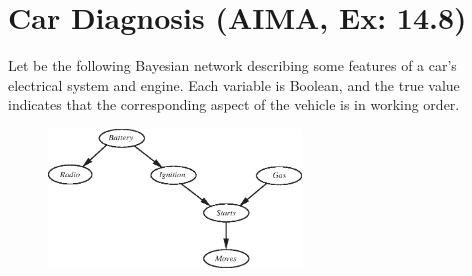 \documentclass[11pt, a4paper]{article}
\begin{document}
\newpage

\section{Car Diagnosis (AIMA, Ex: 14.8)}

Let be the following Bayesian network describing some features of a car's electrical system and engine. Each variable is Boolean, and the true value indicates that the corresponding aspect of the vehicle is in working order.

\begin{figure}[h]
    \centering
    \includegraphics[width=0.6\textwidth]{figures/e3_car.eps}
\end{figure}
\end{document}
